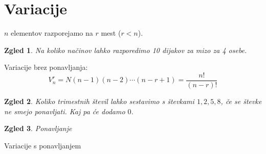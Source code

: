 \documentclass{article}
\newtheorem*{zgled}{Zgled}
\begin{document}
\section{Variacije}

$n$ elementov razporejamo na $r$ mest ($r<n$).

\begin{zgled}
    Na koliko načinov lahko razporedimo 10 dijakov za mizo za 4 osebe.
\end{zgled}

Variacije brez ponavljanja:
\[V_n ^r = N(n-1)(n-2)\cdots (n-r+1)=\frac{n!}{(n-r)!}\]

\begin{zgled}
    Koliko trimestnih števil lahko sestavimo s števkami $1,2,5,8$, če se števke ne smejo ponavljati. Kaj pa će dodamo $0$.
\end{zgled}

\begin{zgled}
    Ponavljanje
\end{zgled}

Variacije s ponavljanjem
\end{document}
